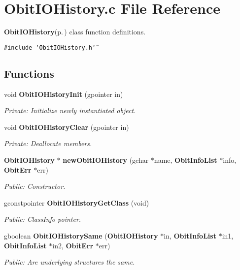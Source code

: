 \section{Obit\-IOHistory.c File Reference}
\label{ObitIOHistory_8c}
{\bf Obit\-IOHistory}{\rm (p.\,\pageref{structObitIOHistory})} class function definitions. 

{\tt \#include \char`\"{}Obit\-IOHistory.h\char`\"{}}\par
\subsection*{Functions}
\begin{CompactItemize}
\item 
void {\bf Obit\-IOHistory\-Init} (gpointer in)
\begin{CompactList}\small\item\em Private: Initialize newly instantiated object. \item\end{CompactList}\item 
void {\bf Obit\-IOHistory\-Clear} (gpointer in)
\begin{CompactList}\small\item\em Private: Deallocate members. \item\end{CompactList}\item 
{\bf Obit\-IOHistory} $\ast$ {\bf new\-Obit\-IOHistory} (gchar $\ast$name, {\bf Obit\-Info\-List} $\ast$info, {\bf Obit\-Err} $\ast$err)
\begin{CompactList}\small\item\em Public: Constructor. \item\end{CompactList}\item 
gconstpointer {\bf Obit\-IOHistory\-Get\-Class} (void)
\begin{CompactList}\small\item\em Public: Class\-Info pointer. \item\end{CompactList}\item 
gboolean {\bf Obit\-IOHistory\-Same} ({\bf Obit\-IOHistory} $\ast$in, {\bf Obit\-Info\-List} $\ast$in1, {\bf Obit\-Info\-List} $\ast$in2, {\bf Obit\-Err} $\ast$err)
\begin{CompactList}\small\item\em Public: Are underlying structures the same. \item\end{CompactList}\item 

\end{CompactItemize}
